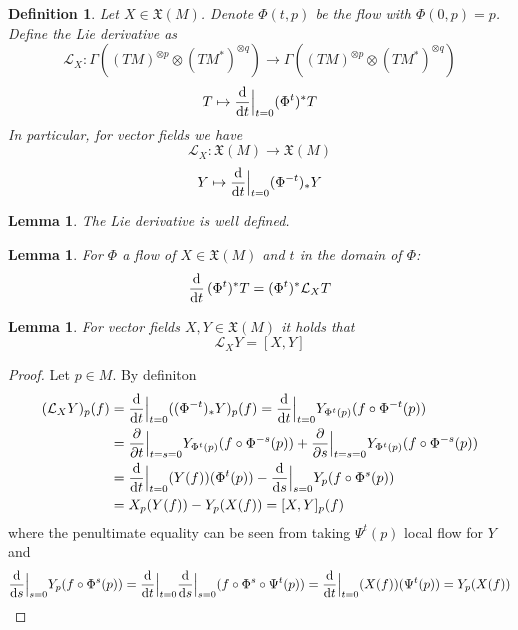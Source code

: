 \documentclass{article}
\numberwithin{theorem}{section}
\newtheorem{lemma}[theorem]{Lemma}
\newtheorem{definition}[theorem]{Definition}
\newcommand{\1}{\mathds{1}}
\begin{document}
\begin{definition}
    Let $X \in \mathfrak{X}(M)$. Denote $\Phi(t,p)$ be the flow with $\Phi(0,p) = p$. Define the Lie derivative as 
    \[ \mathcal{L}_X : \Gamma((TM)^{\otimes p} \otimes (TM^*)^{\otimes q }) \to \Gamma((TM)^{\otimes p} \otimes (TM^*)^{\otimes q })\]
    \[ T \mapsto \dv{}{t}\Big|_{t=0} (\Phi^t)^* T \]
    In particular, for vector fields we have 
    \[ \mathcal{L}_X : \mathfrak{X}(M) \to \mathfrak{X}(M) \]
    \[ Y \mapsto  \dv{}{t}\Big|_{t=0} (\Phi^{-t})_* Y \]
\end{definition}
\begin{lemma}
    The Lie derivative is well defined. 
\end{lemma}

\begin{lemma}\label{flow_derivative}
    For $\Phi$ a flow of $X\in \mathfrak{X}(M)$ and $t$ in the domain of $\Phi$: 
    \[ \dv{}{t}\, (\Phi^t)^* T = (\Phi^t)^*  \mathcal{L}_X T \]
\end{lemma}

\begin{lemma}
    For vector fields $X,Y \in \mathfrak{X}(M)$ it holds that 
    \[ \mathcal{L}_XY = [X,Y] \]
\end{lemma}
\begin{proof}
    Let $p \in M$. By definiton 
    \begin{align*}
        (\mathcal{L}_XY)_p(f) &= \dv{}{t}\Big|_{t=0} ((\Phi^{-t})_* Y)_p (f)  =  \dv{}{t}\Big|_{t=0} Y_{\Phi^t(p)}(f \circ \Phi^{-t}(p))\\  &= \pdv{}{t}\Big|_{t=s=0} Y_{\Phi^t(p)}(f \circ \Phi^{-s}(p)) + \pdv{}{s}\Big|_{t=s=0} Y_{\Phi^t(p)}(f \circ \Phi^{-s}(p)) \\
        &= \dv{}{t}\Big|_{t=0}(Y(f))(\Phi^t(p)) - \dv{}{s}\Big|_{s=0} Y_p(f \circ \Phi^{s}(p)) \\
        &= X_p(Y(f)) - Y_p(X(f)) = [X,Y]_p(f) 
    \end{align*} 
    where the penultimate equality can be seen from taking $\Psi^t(p)$ local flow for $Y$ and 
    \[ \dv{}{s}\Big|_{s=0} Y_p(f \circ \Phi^{s}(p)) = \dv{}{t}\Big|_{t=0} \dv{}{s}\Big|_{s=0} (f\circ \Phi^s \circ \Psi^t(p)) = \dv{}{t}\Big|_{t=0} (X(f))(\Psi^t(p))  = Y_p(X(f))\]
    
\end{proof}
\end{document}
